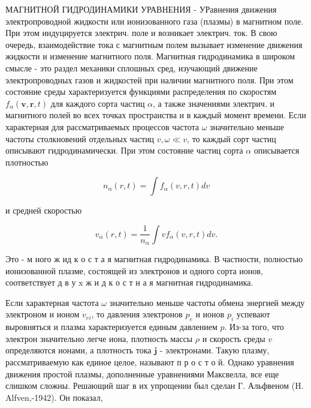 \documentclass[10pt]{article}
\begin{document}
МАГНИТНОЙ ГИДРОДИНАМИКИ УРАВНЕНИЯ - УРавнения движения электропроводной жидкости или ионизованного газа (плазмы) в магнитном поле. При этом индуцируется электрич. поле и возникает электрич. ток. В свою очередь, взаимодействие тока с магнитным полем вызывает изменение движения жидкости и изменение магнитного поля. Магнитная гидродинамика в широком смысле - это раздел механики сплошных сред, изучающий движение электропроводных газов и жидкостей при наличии магнитного поля. При этом состояние среды характеризуется функциями распределения по скоростям $f_{\alpha}(\boldsymbol{v}, \boldsymbol{r}, t)$ для каждого сорта частиц $\alpha$, а также значениями электрич. и магнитного полей во всех точках пространства и в каждый момент времени. Если характерная для рассматриваемых процессов частота $\omega$ значительно меньше частоты столкновений отдельных частиц $v, \omega \ll v$, то каждый сорт частиц описывают гидродинамически. При этом состояние частиц сорта $\alpha$ описывается плотностью



\[

n_{\alpha}(r, t)=\int f_{\alpha}(v, r, t) d v

\]



и средней скоростью



\[

v_{\alpha}(r, t)=\frac{1}{n_{\alpha}} \int v f_{\alpha}(v, r, t) d v .

\]



Это - м ного ж ид к о с т а я магнитная гидродинамика. В частности, полностью ионизованной плазме, состоящей из электронов и одного сорта ионов, соответствует д в у $\mathrm{x}$ ж и д к о с т н а я магнитная гидродинамика.



Если характерная частота $\omega$ значительно меньше частоты обмена энергией между электроном и ионом $v_{e i}$, то давления электронов $p_{e}$ и ионов $p_{i}$ успевают выровняться и плазма характеризуется единым давлением $p$. Из-за того, что электрон значительно легче иона, плотность массы $\rho$ и скорость среды $v$ определяются ионами, а плотность тока $\boldsymbol{j}$ - электронами. Такую плазму, рассматриваемую как единое целое, называют п р о с т о й. Однако уравнения движения простой плазмы, дополненные уравнениями Максвелла, все еще слишком сложны. Решающий шаг в их упрощении был сделан Г. Альфвеном (H. Alfven,-1942). Он показал,
\end{document}

